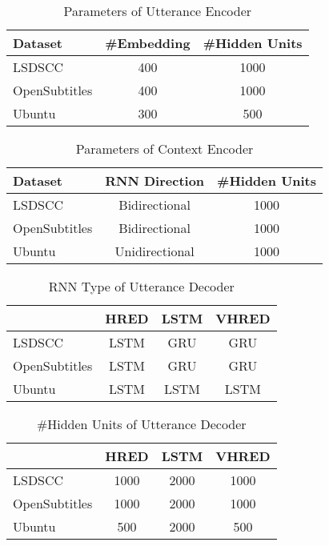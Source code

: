 \begin{table}
    \centering
    \caption{Parameters of Utterance Encoder}
    \label{tab:ParametersOfUtteranceEncoder}
    \begin{tabular}{|l|c|c|}
        \hline
        Dataset & {\#Embedding} & {\#Hidden Units} \\
        \hline
        LSDSCC & 400 & 1000 \\
        \hline
        OpenSubtitles & 400 & 1000 \\
        \hline
        Ubuntu & 300 & 500 \\
        \hline
    \end{tabular}
\end{table}

\begin{table}
    \centering
    \caption{Parameters of Context Encoder}
    \label{tab:ParametersOfContextEncoder}
    \begin{tabular}{|l|c|c|}
        \hline
        Dataset & RNN Direction & \#Hidden Units \\
        \hline
        LSDSCC & Bidirectional & 1000 \\
        \hline
        OpenSubtitles & Bidirectional & 1000 \\
        \hline
        Ubuntu & Unidirectional & 1000 \\
        \hline
    \end{tabular}
\end{table}

\begin{table}
    \centering
    \caption{RNN Type of Utterance Decoder}
    \label{tab:RNNTypeOfUtteranceDecoder}
    \begin{tabular}{|l|*{3}{c|}}
        \hline
        & HRED & LSTM & VHRED \\
        \hline
        LSDSCC & LSTM & GRU & GRU \\
        \hline
        OpenSubtitles & LSTM & GRU & GRU \\
        \hline
        Ubuntu & LSTM & LSTM & LSTM \\
        \hline
    \end{tabular}
\end{table}

\begin{table}
    \centering
    \caption{\#Hidden Units of Utterance Decoder}
    \label{tab:HiddenUnitsOfUtteranceDecoder}
    \begin{tabular}{|l|*{3}{c|}}
        \hline
        & HRED & LSTM & VHRED \\
        \hline
        LSDSCC & 1000 & 2000 & 1000 \\
        \hline
        OpenSubtitles & 1000 & 2000 & 1000 \\
        \hline
        Ubuntu & 500 & 2000 & 500 \\
        \hline
    \end{tabular}
\end{table}
